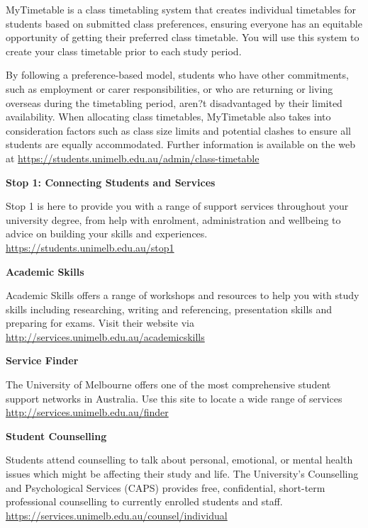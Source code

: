 \documentclass[10pt]{article}
\begin{document}
\begin{multicols}{2}
\smallskip\noindent MyTimetable is a class timetabling system that creates individual timetables for students based on submitted class preferences, ensuring everyone has an equitable opportunity of getting their preferred class timetable. You will use this system to create your class timetable prior to each study period.

\smallskip\noindent By following a preference-based model, students who have other commitments, such as employment or carer responsibilities, or who are returning or living overseas during the timetabling period, aren?t disadvantaged by their limited availability. When allocating class timetables, MyTimetable also takes into consideration factors such as class size limits and potential clashes to ensure all students are equally accommodated. Further information is available on the web at \href{https://students.unimelb.edu.au/admin/class-timetable}{https://students.unimelb.edu.au/admin/class-timetable} 


\smallskip\noindent\textbf{Stop 1: Connecting Students and Services}

\smallskip\noindent Stop 1 is here to provide you with a range of support services throughout your university degree, from help with enrolment, administration and wellbeing to advice on building your skills and experiences. \href{https://students.unimelb.edu.au/stop1}{https://students.unimelb.edu.au/stop1}

\smallskip\noindent\textbf{Academic Skills}

\smallskip\noindent Academic Skills offers a range of workshops and resources to help you with study skills including researching, writing and referencing, presentation skills and preparing for exams.  Visit their website via \href{http://services.unimelb.edu.au/academicskills}{http://services.unimelb.edu.au/academicskills}

\smallskip\noindent\textbf{Service Finder}

\smallskip\noindent The University of Melbourne offers one of the most comprehensive student support networks in Australia. Use this site to locate a wide range of services \href{http://services.unimelb.edu.au/finder}{http://services.unimelb.edu.au/finder}

\smallskip\noindent\textbf{Student Counselling}

\smallskip\noindent Students attend counselling to talk about personal, emotional, or mental health issues which might be affecting their study and life. The University's Counselling and Psychological Services (CAPS) provides free, confidential, short-term professional counselling to currently enrolled students and staff. \href{https://services.unimelb.edu.au/counsel/individual}{https://services.unimelb.edu.au/counsel/individual}





\end{multicols}
\end{document}
